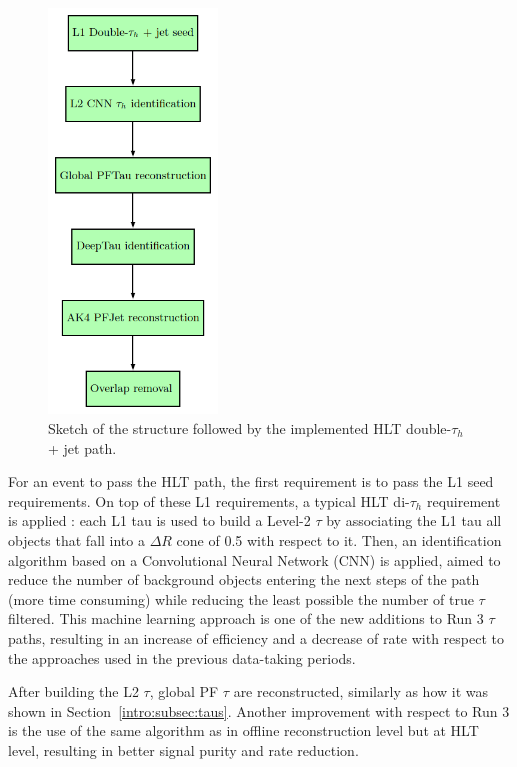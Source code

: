 \documentclass[../main.tex]{subfiles}
\begin{document}
\begin{figure}
\begin{center}
\includegraphics[width=0.4\textwidth]{Images/HLT_Path}
\end{center}
\caption{Sketch of the structure followed by the implemented HLT double-$\tau_h$ + jet path.}
\label{hh:fig:hlt_path}
\end{figure}

For an event to pass the HLT path, the first requirement is to pass the L1 seed requirements. On top of these L1 requirements, a typical HLT di-$\tau_h$ requirement is applied \cite{intro:exp:cms_trigger}: each L1 tau is used to build a Level-2 $\tau$ by associating the L1 tau all objects that fall into a $\Delta R$ cone of 0.5 with respect to it. Then, an identification algorithm based on a Convolutional Neural Network (CNN) is applied, aimed to reduce the number of background objects entering the next steps of the path (more time consuming) while reducing the least possible the number of true $\tau$ filtered. This machine learning approach is one of the new additions to Run 3 $\tau$ paths, resulting in an increase of efficiency and a decrease of rate with respect to the approaches used in the previous data-taking periods. 

After building the L2 $\tau$, global PF $\tau$ are reconstructed, similarly as how it was shown in Section~\ref{intro:subsec:taus}. Another improvement with respect to Run 3 is the use of the same \deeptau{} algorithm as in offline reconstruction level but at HLT level, resulting in better signal purity and rate reduction.
\end{document}
